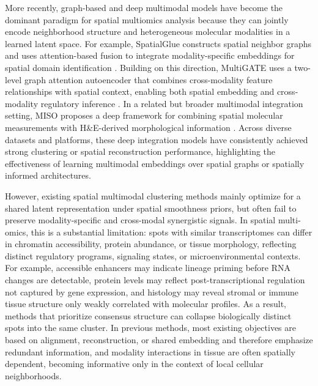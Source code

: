 \documentclass{article}
\theoremstyle{plain}
\theoremstyle{definition}
\begin{document}
More recently, graph-based and deep multimodal models have become the dominant paradigm for spatial multiomics analysis because they can jointly encode neighborhood structure and heterogeneous molecular modalities in a learned latent space. For example, SpatialGlue constructs spatial neighbor graphs and uses attention-based fusion to integrate modality-specific embeddings for spatial domain identification \cite{long2024spatialglue}. Building on this direction, MultiGATE uses a two-level graph attention autoencoder that combines cross-modality feature relationships with spatial context, enabling both spatial embedding and cross-modality regulatory inference \cite{miao2025multigate}. In a related but broader multimodal integration setting, MISO proposes a deep framework for combining spatial molecular measurements with H\&E-derived morphological information \cite{coleman2025miso}. Across diverse datasets and platforms, these deep integration models have consistently achieved strong clustering or spatial reconstruction performance, highlighting the effectiveness of learning multimodal embeddings over spatial graphs or spatially informed architectures.

However, existing spatial multimodal clustering methods mainly optimize for a shared latent representation under spatial smoothness priors, but often fail to preserve modality-specific and cross-modal synergistic signals. In spatial multi-omics, this is a substantial limitation: spots with similar transcriptomes can differ in chromatin accessibility, protein abundance, or tissue morphology, reflecting distinct regulatory programs, signaling states, or microenvironmental contexts. For example, accessible enhancers may indicate lineage priming before RNA changes are detectable, protein levels may reflect post-transcriptional regulation not captured by gene expression, and histology may reveal stromal or immune tissue structure only weakly correlated with molecular profiles. As a result, methods that prioritize consensus structure can collapse biologically distinct spots into the same cluster. In previous methods, most existing objectives are based on alignment, reconstruction, or shared embedding and therefore emphasize redundant information, and modality interactions in tissue are often spatially dependent, becoming informative only in the context of local cellular neighborhoods.
\end{document}
